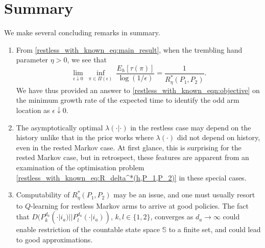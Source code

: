 \section{Summary}
\label{restless_with_known_sec:conclusions}
We make several concluding remarks in summary.
\begin{enumerate}
\item  From \eqref{restless_with_known_eq:main_result}, when the trembling hand parameter $\eta>0$, we see that
\begin{equation}
	\lim\limits_{\epsilon\downarrow 0} ~ \inf\limits_{\pi\in\Pi(\epsilon)} ~ \frac{E_h[\tau(\pi)]}{\log(1/\epsilon)} = \frac{1}{R_\eta^*(P_1,P_2)}.\label{restless_with_known_eq:final-result}
\end{equation}
We have thus provided an answer to \eqref{restless_with_known_eqn:objective} on the minimum growth rate of the expected time to identify the odd arm location as $\epsilon \downarrow 0$.

\item The asymptotically optimal $\lambda(\cdot|\cdot)$ in the restless case may depend on the history unlike that in the prior works \cite{Vaidhiyan2017, vaidhiyan2012active, vaidhiyan2017learning, prabhu2017optimal} where $\lambda(\cdot)$ did not depend on history, even in the rested Markov case. At first glance, this is surprising for the rested Markov case, but in retrospect, these features are apparent from an examination of the optimisation problem \eqref{restless_with_known_eq:R_delta^*(h,P_1,P_2)} in these special cases. 

\item Computability of $R_\eta^*(P_1,P_2)$ may be an issue, and one must usually resort to $Q$-learning for restless Markov arms \cite{avrachenkov2020whittle} to arrive at good policies. The fact that $D(P_k^{d_a} (\cdot | i_a) || P_l^{d_a} (\cdot | i_a))$, $k,l\in\{1,2\}$, converges as $d_a \rightarrow \infty$ could enable restriction of the countable state space $\mathbb{S}$ to a finite set, and could lead to good approximations.



\end{enumerate}
